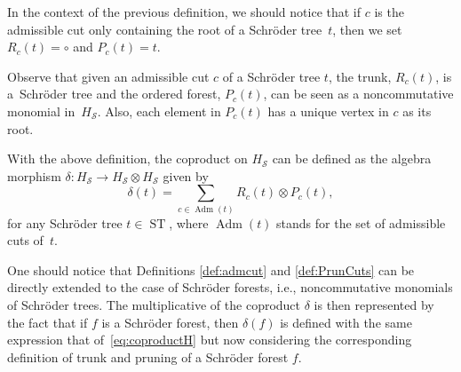 \documentclass[pdftex]{sigma}%
\numberwithin{equation}{section}
\newcommand{\ST}{\operatorname{ST}}
\newcommand{\cHS}{H_\mathcal{S}}
\begin{document}
\begin{Remark}In the context of the previous definition, we should notice that if $c$ is the admissible cut only containing the root of a Schr\"oder tree~$t$, then we set~$R_c(t) = \circ$ and $P_c(t) = t$.
\end{Remark}

\begin{Remark}Observe that given an admissible cut $c$ of a Schr\"oder tree $t$, the trunk, $R_c(t)$, is a~Schr\"oder tree and the ordered forest, $P_c(t)$, can be seen as a noncommutative monomial in~$\cHS$. Also, each element in $P_c(t)$ has a unique vertex in $c$ as its root.
\end{Remark}

With the above definition, the coproduct on $\cHS$ can be defined as the algebra morphism $\delta\colon \cHS\to \cHS\otimes \cHS$ given by
\begin{equation}\label{eq:coproductH}
	\delta(t) = \sum_{c \in \operatorname{Adm}(t)} R_c(t)\otimes P_c(t),
\end{equation}
for any Schr\"oder tree $t \in \ST$, where $\operatorname{Adm}(t)$ stands for the set of admissible cuts of~$t$.

\begin{Remark}
One should notice that Definitions \ref{def:admcut} and \ref{def:PrunCuts} can be directly extended to the case of Schr\"oder forests, i.e., noncommutative monomials of Schr\"oder trees. The multiplicative of the coproduct $\delta$ is then represented by the fact that if $f$ is a Schr\"oder forest, then $\delta(f)$ is defined with the same expression that of~\eqref{eq:coproductH} but now considering the corresponding definition of trunk and pruning of a Schr\"oder forest $f$.
\end{Remark}
\end{document}
